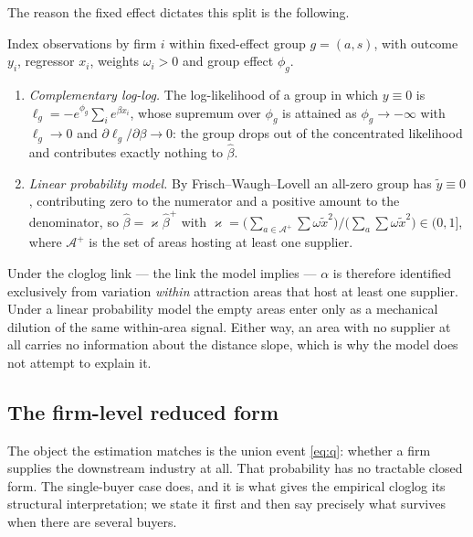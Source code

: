 The reason the fixed effect dictates this split is the following.

\begin{lemma}
\label{lem:fe}
Index observations by firm $i$ within fixed-effect group $g=(a,s)$, with outcome $y_{i}$,
regressor $x_{i}$, weights $\omega_{i}>0$ and group effect $\phi_{g}$.
\begin{enumerate}[nosep,topsep=2pt,label=(\roman*)]
\item \emph{Complementary log-log.} The log-likelihood of a group in which $y\equiv0$ is
$\ell_{g}=-e^{\phi_{g}}\sum_{i}e^{\beta x_{i}}$, whose supremum over $\phi_{g}$ is attained as
$\phi_{g}\to-\infty$ with $\ell_{g}\to0$ and $\partial\ell_{g}/\partial\beta\to0$: the group
drops out of the concentrated likelihood and contributes exactly nothing to $\hat\beta$.
\item \emph{Linear probability model.} By Frisch--Waugh--Lovell an all-zero group has
$\tilde y\equiv0$, contributing zero to the numerator and a positive amount to the denominator,
so $\hat\beta=\varkappa\hat\beta^{+}$ with
$\varkappa=\big(\sum_{a\in\mathcal{A}^{+}}\sum\omega\tilde x^{2}\big)/\big(\sum_{a}\sum\omega\tilde x^{2}\big)\in(0,1]$,
where $\mathcal{A}^{+}$ is the set of areas hosting at least one supplier.
\end{enumerate}
\end{lemma}

Under the cloglog link --- the link the model implies --- $\alpha$ is therefore identified
exclusively from variation \emph{within} attraction areas that host at least one supplier. Under
a linear probability model the empty areas enter only as a mechanical dilution of the same
within-area signal. Either way, an area with no supplier at all carries no information about the
distance slope, which is why the model does not attempt to explain it.

\subsection{The firm-level reduced form}
\label{app:model-prop}

The object the estimation matches is the union event \eqref{eq:q}: whether a firm supplies the
downstream industry at all. That probability has no tractable closed form. The single-buyer case
does, and it is what gives the empirical cloglog its structural interpretation; we state it
first and then say precisely what survives when there are several buyers.

